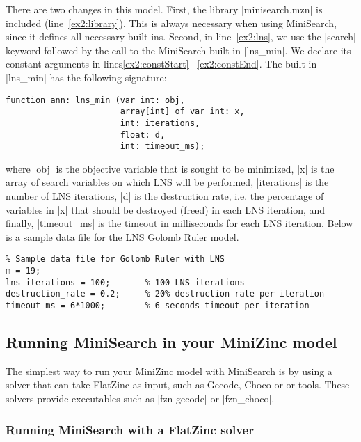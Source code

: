 \documentclass[a4paper,13pt,onecolumn]{article}%
\begin{document}
There are two changes in this model.
First, the library \mzninline|minisearch.mzn| is included (line~\ref{ex2:library}). This
is always necessary when using MiniSearch, since it defines all necessary built-ins. 
Second, in line~\ref{ex2:lns}, we use the \mzninline|search| keyword
followed by the call to the MiniSearch built-in \mzninline|lns_min|. We declare its constant arguments 
in lines\ref{ex2:constStart}-~\ref{ex2:constEnd}.
The built-in  \mzninline|lns_min| has  the following signature:
\begin{lstlisting}
function ann: lns_min (var int: obj, 
                       array[int] of var int: x,
                       int: iterations, 
                       float: d,
                       int: timeout_ms);
\end{lstlisting}
where \mzninline|obj| is the objective variable that is sought to be minimized,
\mzninline|x| is the array of search variables on which LNS will be performed,
\mzninline|iterations| is the number of LNS iterations, \mzninline|d| is the 
destruction rate, i.e. the percentage of variables in \mzninline|x| that 
should be destroyed (freed) in each LNS iteration, and finally, 
\mzninline|timeout_ms| is the timeout in milliseconds for each 
LNS iteration. Below is a sample data file for the LNS Golomb Ruler model.
\begin{lstlisting}
% Sample data file for Golomb Ruler with LNS
m = 19;                    
lns_iterations = 100;       % 100 LNS iterations
destruction_rate = 0.2;     % 20% destruction rate per iteration
timeout_ms = 6*1000;        % 6 seconds timeout per iteration
\end{lstlisting}

\subsection{Running MiniSearch in your MiniZinc model}


The simplest way to run your MiniZinc model with MiniSearch
is by using a solver that can take FlatZinc as input, such 
as Gecode, Choco or or-tools. These solvers provide executables
such as \mzninline|fzn-gecode| or \mzninline|fzn_choco|.


\subsubsection{Running MiniSearch with a FlatZinc solver}
\end{document}
